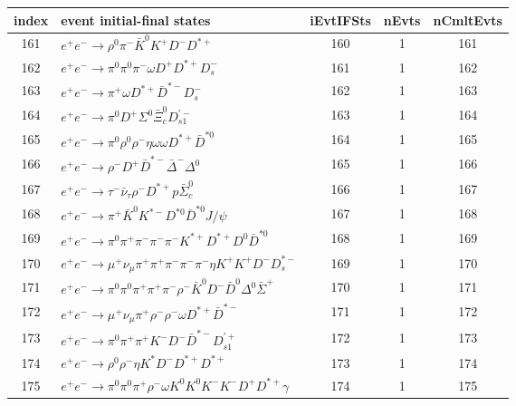 \documentclass[landscape]{article}
\begin{document}
\begin{table}[htbp!]
\small
\centering
\begin{tabular}{|c|>{\centering}p{18cm}|c|c|c|}
\hline
index & event initial-final states & iEvtIFSts & nEvts & nCmltEvts \\
\hline
161 & $ e^{+} e^{-} \rightarrow \rho^{0} \pi^{-} \bar{K}^{0} K^{+} D^{-} D^{*+} $ & 160 & 1 & 161 \\
\hline
162 & $ e^{+} e^{-} \rightarrow \pi^{0} \pi^{0} \pi^{-} \omega D^{+} D^{*+} D_{s}^{-} $ & 161 & 1 & 162 \\
\hline
163 & $ e^{+} e^{-} \rightarrow \pi^{+} \omega D^{*+} \bar{D}^{*-} D_{s}^{-} $ & 162 & 1 & 163 \\
\hline
164 & $ e^{+} e^{-} \rightarrow \pi^{0} D^{+} \Sigma^{0} \bar{\Xi}_{c}^{0} D_{s1}^{\prime-} $ & 163 & 1 & 164 \\
\hline
165 & $ e^{+} e^{-} \rightarrow \pi^{0} \rho^{0} \rho^{-} \eta \omega \omega D^{*+} \bar{D}^{*0} $ & 164 & 1 & 165 \\
\hline
166 & $ e^{+} e^{-} \rightarrow \rho^{-} D^{+} \bar{D}^{*-} \bar{\Delta}^{-} \Delta^{0} $ & 165 & 1 & 166 \\
\hline
167 & $ e^{+} e^{-} \rightarrow \tau^{-} \bar{\nu}_{\tau} \rho^{-} D^{*+} p \bar{\Sigma}_{c}^{0} $ & 166 & 1 & 167 \\
\hline
168 & $ e^{+} e^{-} \rightarrow \pi^{+} \bar{K}^{0} K^{*-} D^{*0} \bar{D}^{*0} J/\psi $ & 167 & 1 & 168 \\
\hline
169 & $ e^{+} e^{-} \rightarrow \pi^{0} \pi^{+} \pi^{-} \pi^{-} \pi^{-} K^{*+} D^{*+} D^{0} \bar{D}^{*0} $ & 168 & 1 & 169 \\
\hline
170 & $ e^{+} e^{-} \rightarrow \mu^{+} \nu_{\mu} \pi^{+} \pi^{+} \pi^{-} \pi^{-} \pi^{-} \eta K^{+} K^{+} D^{-} D_{s}^{*-} $ & 169 & 1 & 170 \\
\hline
171 & $ e^{+} e^{-} \rightarrow \pi^{0} \pi^{0} \pi^{+} \pi^{+} \pi^{-} \rho^{-} \bar{K}^{0} D^{-} \bar{D}^{0} \Delta^{0} \bar{\Sigma}^{+} $ & 170 & 1 & 171 \\
\hline
172 & $ e^{+} e^{-} \rightarrow \mu^{+} \nu_{\mu} \pi^{+} \rho^{-} \rho^{-} \omega D^{*+} \bar{D}^{*-} $ & 171 & 1 & 172 \\
\hline
173 & $ e^{+} e^{-} \rightarrow \pi^{0} \pi^{+} \pi^{+} K^{-} D^{-} \bar{D}^{*-} D_{s1}^{\prime+} $ & 172 & 1 & 173 \\
\hline
174 & $ e^{+} e^{-} \rightarrow \rho^{0} \rho^{-} \eta K^{*} D^{-} D^{*+} D^{*+} $ & 173 & 1 & 174 \\
\hline
175 & $ e^{+} e^{-} \rightarrow \pi^{0} \pi^{0} \pi^{+} \rho^{-} \omega K^{0} K^{0} K^{-} K^{-} D^{+} D^{*+} \gamma $ & 174 & 1 & 175 \\

\end{tabular}
\end{table}
\end{document}
